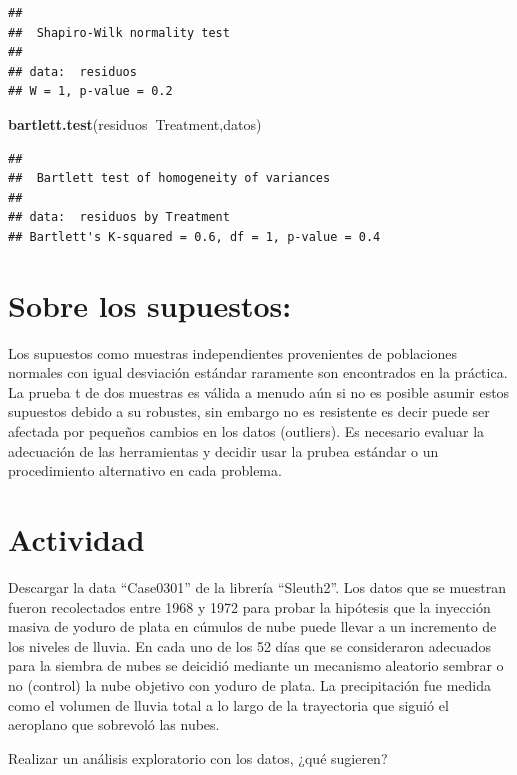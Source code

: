 \documentclass[]{book}
\newenvironment{Shaded}{\begin{snugshade}}{\end{snugshade}}
\newcommand{\KeywordTok}[1]{\textcolor[rgb]{0.13,0.29,0.53}{\textbf{#1}}}
\newcommand{\OperatorTok}[1]{\textcolor[rgb]{0.81,0.36,0.00}{\textbf{#1}}}
\newcommand{\NormalTok}[1]{#1}
\begin{document}
\begin{verbatim}
## 
##  Shapiro-Wilk normality test
## 
## data:  residuos
## W = 1, p-value = 0.2
\end{verbatim}

\begin{Shaded}
\begin{Highlighting}[]
\KeywordTok{bartlett.test}\NormalTok{(residuos}\OperatorTok{~}\NormalTok{Treatment,datos)}
\end{Highlighting}
\end{Shaded}

\begin{verbatim}
## 
##  Bartlett test of homogeneity of variances
## 
## data:  residuos by Treatment
## Bartlett's K-squared = 0.6, df = 1, p-value = 0.4
\end{verbatim}

\section{Sobre los supuestos:}\label{sobre-los-supuestos}

Los supuestos como muestras independientes provenientes de poblaciones
normales con igual desviación estándar raramente son encontrados en la
práctica. La prueba t de dos muestras es válida a menudo aún si no es
posible asumir estos supuestos debido a su robustes, sin embargo no es
resistente es decir puede ser afectada por pequeños cambios en los datos
(outliers). Es necesario evaluar la adecuación de las herramientas y
decidir usar la prubea estándar o un procedimiento alternativo en cada
problema.

\section{Actividad}\label{actividad-1}

Descargar la data ``Case0301'' de la librería ``Sleuth2''. Los datos que
se muestran fueron recolectados entre 1968 y 1972 para probar la
hipótesis que la inyección masiva de yoduro de plata en cúmulos de nube
puede llevar a un incremento de los niveles de lluvia. En cada uno de
los 52 días que se consideraron adecuados para la siembra de nubes se
deicidió mediante un mecanismo aleatorio sembrar o no (control) la nube
objetivo con yoduro de plata. La precipitación fue medida como el
volumen de lluvia total a lo largo de la trayectoria que siguió el
aeroplano que sobrevoló las nubes.

Realizar un análisis exploratorio con los datos, ¿qué sugieren?
\end{document}
